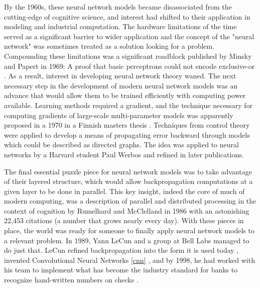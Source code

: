 By the 1960s, these neural network models became disassociated from the cutting-edge of cognitive science, and interest had shifted to their application in modeling and industrial computation. The hardware limitations of the time served as a significant barrier to wider application and the concept of the "neural network" was sometimes treated as a solution looking for a problem. Compounding these limitations was a significant roadblock published by Minsky and Papert in 1969: A proof that basic perceptrons could not encode exclusive-or \cite{minsky1969perceptrons}. As a result, interest in developing neural network theory waned. The next necessary step in the development of modern neural network models was an advance that would allow them to be trained efficiently with computing power available. Learning methods required a gradient, and the technique necessary for computing gradients of large-scale multi-parameter models was apparently proposed in a 1970 in a Finnish masters thesis \cite{linnainmaa1970representation}. Techniques from control theory were applied to develop a means of propagating error backward through models which could be described as directed graphs. The idea was applied to neural networks by a Harvard student Paul Werbos\cite{werbos1974beyond} and refined in later publications. 

The final essential puzzle piece for neural network models was to take advantage of their layered structure, which would allow backpropagation computations at a given layer to be done in parallel. This key insight, indeed the core of much of modern computing, was a description of parallel and distributed processing in the context of cognition by Rumelhard and McClelland in 1986 \cite{mcclelland1986parallel} with an astonishing 22,453 citations (a number that grows nearly every day). With these pieces in place, the world was ready for someone to finally apply neural network models to a relevant problem. In 1989, Yann LeCun and a group at Bell Labs managed to do just that. LeCun  refined backpropagation into the form it is used today \cite{lecun1989backpropagation}, invented Convolutional Neural Networks \ref{cnn} \cite{lecun1995convolutional}, and by 1998, he had worked with his team to implement what has  become the industry standard for banks to recognize hand-written numbers on checks \cite{lecun1998gradient}. 

